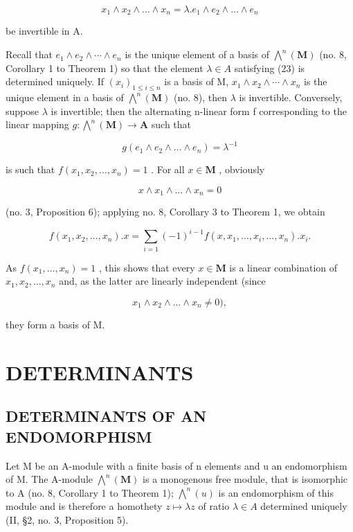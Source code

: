 \[
x _ {1} \wedge x _ {2} \wedge \dots \wedge x _ {n} = \lambda . e _ {1} \wedge e _ {2} \wedge \dots \wedge e _ {n}\tag{23}
\]

be invertible in A.

Recall that \(e_{1} \wedge e_{2} \wedge \cdots \wedge e_{n}\) is the unique element of a basis of \(\bigwedge^{n}(\mathbf{M})\) (no. 8, Corollary 1 to Theorem 1) so that the element \(\lambda \in A\) satisfying (23) is determined uniquely. If \((x_{i})_{1 \leqslant i \leqslant n}\) is a basis of M, \(x_{1} \wedge x_{2} \wedge \cdots \wedge x_{n}\) is the unique element in a basis of \(\bigwedge^{n}(\mathbf{M})\) (no. 8), then \(\lambda\) is invertible. Conversely, suppose \(\lambda\) is invertible; then the alternating n-linear form f corresponding to the linear mapping \(g: \bigwedge^{n}(\mathbf{M}) \to \mathbf{A}\) such that

\[
g (e _ {1} \wedge e _ {2} \wedge \dots \wedge e _ {n}) = \lambda^ {- 1}
\]

is such that \(f(x_{1}, x_{2}, \ldots, x_{n}) = 1\) . For all \(x \in \mathbf{M}\) , obviously

\[
x \wedge x _ {1} \wedge \dots \wedge x _ {n} = 0
\]

(no. 3, Proposition 6); applying no. 8, Corollary 3 to Theorem 1, we obtain

\[
f (x _ {1}, x _ {2}, \dots , x _ {n}). x = \sum_ {i = 1} (- 1) ^ {i - 1} f (x, x _ {1}, \dots , \hat {x} _ {i}, \dots , x _ {n}). x _ {i}.
\]

As \(f(x_{1},\ldots ,x_{n}) = 1\) , this shows that every \(x\in \mathbf{M}\) is a linear combination of \(x_{1},x_{2},\ldots ,x_{n}\) and, as the latter are linearly independent (since

\[
x _ {1} \wedge x _ {2} \wedge \dots \wedge x _ {n} \neq 0),
\]

they form a basis of M.

\section{DETERMINANTS}

\subsection{DETERMINANTS OF AN ENDOMORPHISM}

Let M be an A-module with a finite basis of n elements and u an endomorphism of M. The A-module \(\bigwedge^{n}(\mathbf{M})\) is a monogenous free module, that is isomorphic to A (no. 8, Corollary 1 to Theorem 1); \(\bigwedge^{n}(u)\) is an endomorphism of this module and is therefore a homothety \(z \mapsto \lambda z\) of ratio \(\lambda \in A\) determined uniquely (II, §2, no. 3, Proposition 5).

